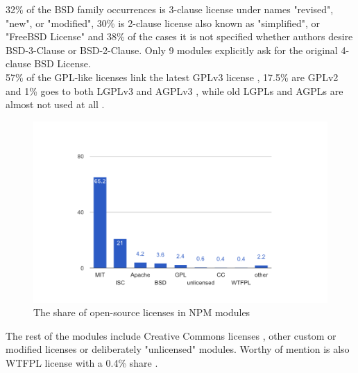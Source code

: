 \documentclass[thesis=M,english]{FITthesis}[2012/10/20]
\begin{document}
32\% of the BSD family occurrences is 3-clause license under names "revised", "new", or "modified", 30\% is 2-clause license also known as "simplified", or "FreeBSD License" and 38\% of the cases it is not specified whether authors desire BSD-3-Clause or BSD-2-Clause. Only 9 modules explicitly ask for the original 4-clause BSD License. \\

57\% of the GPL-like licenses link the latest GPLv3 license \cite{license_gpl}, 17.5\% are GPLv2 \cite{license_gpl2} and 1\% goes to both LGPLv3  and AGPLv3 \cite{license_lgpl3, license_agpl3}, while old LGPLs and AGPLs are almost not used at all \cite{license_lgpl20, license_lgpl21, license_agpl1, license_agpl2}. \\


\begin{center}
\begin{figure}[h!]
	\hspace*{-1cm}\includegraphics[totalheight=265pt]{images/npm_licenses.png}
	\caption{The share of open-source licenses in NPM modules}
	\label{fig: npm_licenses}
\end{figure}
\end{center}

The rest of the modules include Creative Commons licenses \cite{license_ccs}, other custom or modified licenses or deliberately "unlicensed" modules. Worthy of mention is also WTFPL license with a 0.4\% share \cite{license_wtfpl}. \\
\end{document}
